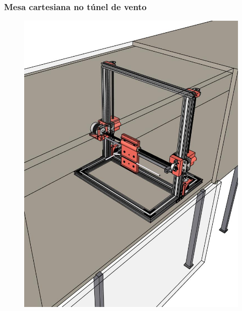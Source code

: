 
\begin{frame}
    \frametitle{Mesa cartesiana no túnel de vento}
        \begin{figure}
            \centering
            \includegraphics[scale = 0.15]{figuras/mesatunel}
        \end{figure}
\end{frame}


